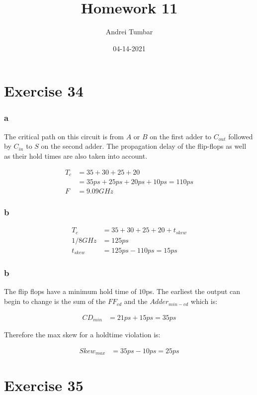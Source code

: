 \documentclass[11pt]{article}
\title{\textbf{Homework 11}}
\author{Andrei Tumbar}
\date{04-14-2021}
\begin{document}
\maketitle

\section*{Exercise 34}
\subsubsection*{a}

The critical path on this circuit is from $A$ or $B$ on the first adder
to $C_{out}$ followed by $C_{in}$ to $S$ on the second adder. The propagation
delay of the flip-flops as well as their hold times are also taken into account.

\begin{align*}
T_{c} &= 35 + 30 + 25 + 20\\
&= 35ps + 25ps + 20ps + 10ps = 110ps\\
F &= 9.09 GHz
\end{align*}

\subsubsection*{b}

\begin{align*}
T_{c} &= 35 + 30 + 25 + 20 + t_{skew}\\
1/8 GHz &= 125ps\\
t_{skew} &= 125ps - 110ps = 15ps
\end{align*}

\subsubsection*{b}
The flip flops have a minimum hold time of $10$ps. The earliest the output
can begin to change is the sum of the $FF_{cd}$ and the $Adder_{min-cd}$
which is:

\begin{align*}
CD_{min} &= 21ps + 15ps = 35ps
\end{align*}

Therefore the max skew for a holdtime violation is:

\begin{align*}
Skew_{max} &= 35ps - 10ps = 25ps
\end{align*}

\section*{Exercise 35}
\end{document}
